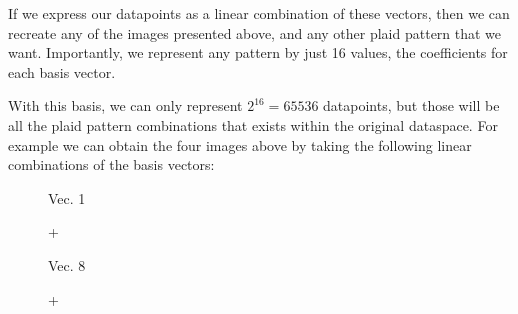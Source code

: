 \documentclass[12pt]{report}
\begin{document}
            If we express our datapoints as a linear combination of these vectors, then we can recreate any of the images presented above, and any other plaid pattern that we want. Importantly, we represent any pattern by just 16 values, the coefficients for each basis vector.

            With this basis, we can only represent $2^{16} = 65536$ datapoints, but those will be all the plaid pattern combinations that exists within the original dataspace. For example we can obtain the four images above by taking the following linear combinations of the basis vectors:

            \begin{figure}[H]
                \centering
                \begin{minipage}{0.1\textwidth}
                    \centering
                    Vec. 1
                \end{minipage}
                \begin{minipage}{0.035\textwidth}
                    \centering
                    \quad+\quad
                \end{minipage}
                \begin{minipage}{0.1\textwidth}
                    \centering
                    Vec. 8
                \end{minipage}
                \begin{minipage}{0.035\textwidth}
                    \centering
                    \quad+\quad
                \end{minipage}
                \begin{minipage}{0.1\textwidth}
                    \centering
                    \IApixelimage[0.65in]{
}
\end{minipage}
\end{figure}
\end{document}
